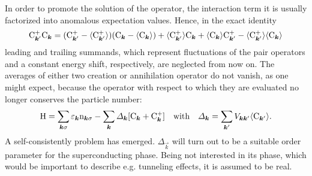 In order to promote the solution of the  operator, the
interaction term it is usually factorized into anomalous expectation values.
Hence, in the exact identity \cite[Eq.~4.20]{Nolting15}
%
\begin{equation*}
	\mathrm C_{\boldsymbol k'}^+ \mathrm C_{\boldsymbol k} =
    (\mathrm C_{\boldsymbol k'}^+ - \langle\mathrm C_{\boldsymbol k'}^+\rangle)
    (\mathrm C_{\boldsymbol k} - \langle\mathrm C_{\boldsymbol k}\rangle)
    + \langle\mathrm C_{\boldsymbol k'}^+\rangle \mathrm C_{\boldsymbol k}
    + \langle\mathrm C_{\boldsymbol k}\rangle \mathrm C_{\boldsymbol k'}^+
    - \langle\mathrm C_{\boldsymbol k'}^+\rangle \langle\mathrm C_{\boldsymbol k}\rangle
\end{equation*}
%
leading and trailing summands, which represent fluctuations of the 
pair operators and a constant energy shift, respectively, are neglected from now
on. The averages of either two creation or annihilation operator do not vanish,
as one might expect, because the  operator with respect to which
they are evaluated no longer conserves the particle number:
%
\begin{equation*}
    \mathrm H = \sum_{\boldsymbol k \sigma} \varepsilon_{\boldsymbol k} \mathrm n_{\boldsymbol k \sigma}
    - \sum_{\boldsymbol k} \varDelta_{\boldsymbol k} [\mathrm C_{\boldsymbol k} + \mathrm C_{\boldsymbol k}^+]
    \quad \text{with} \quad
    \varDelta_{\boldsymbol k} = \sum_{\boldsymbol k'} V_{\boldsymbol k \boldsymbol k'} \langle\mathrm C_{\boldsymbol k'}\rangle.
\end{equation*}
%
A self-consistently problem has emerged. $\Delta_{\vec k}$ will turn out to be a
suitable order parameter for the superconducting phase. Being not interested in
its phase, which would be important to describe e.g. tunneling effects, it is
assumed to be real.

